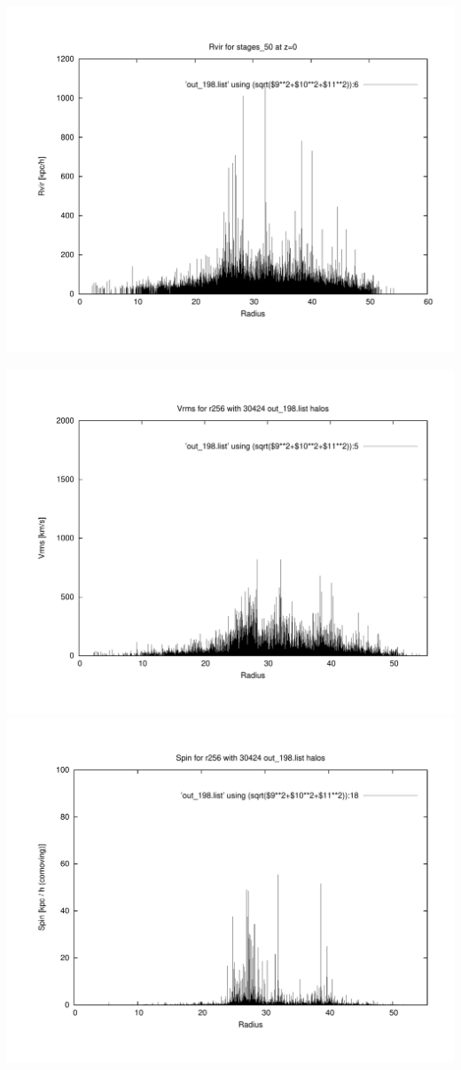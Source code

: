 \includegraphics[scale=0.3]{r256/h100/stages_50/plot_rvir_z0.pdf}

\includegraphics[scale=0.3]{r256/h100/stages_50/plot_Vrms_out_198.pdf}
\includegraphics[scale=0.3]{r256/h100/stages_50/plot_spin_out_198.pdf}

